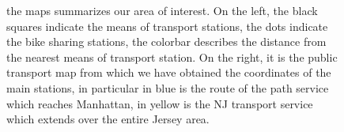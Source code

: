 \begin{figure}[h!]
	\centering
	\quad
	\quad
	\caption[]{the maps summarizes our area of interest. On the left, the black squares indicate the means of transport stations, the dots indicate the bike sharing stations, the colorbar describes the distance from the nearest means of transport station. On the right, it is the public transport map from which we have obtained the coordinates of the main stations, in particular in blue is the route of the path service which reaches Manhattan, in yellow is the NJ transport service which extends over the entire Jersey area.}
\end{figure} 

